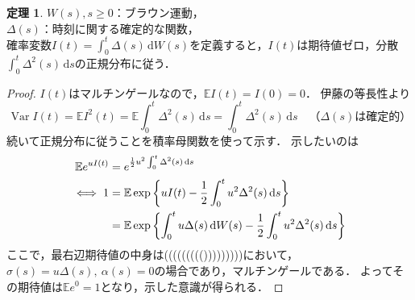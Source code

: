 \documentclass[a4paper, lualatex, ja=standard]{bxjsarticle}
\theoremstyle{definition}
\newtheorem{thm}{定理}[subsection]
\newcommand{\E}{\mathbb{E}}
\newcommand{\diff}{\mathrm{d}}
\begin{document}
\begin{thm}
  $W(s),s\geq0$：ブラウン運動，\\
  $\Delta(s)$：時刻に関する確定的な関数，\\
  確率変数$I(t)=\int_0^t\Delta(s)\,\diff W(s)$を定義すると，$I(t)$は期待値ゼロ，分散$\int_0^t\Delta^2(s)\,\diff s$の正規分布に従う．
\end{thm}
\begin{proof}
  $I(t)$はマルチンゲールなので，$\E I(t)=I(0)=0$．
  伊藤の等長性より
  \begin{equation*}
    \operatorname{Var} I(t) = \E I^2(t) = \E\int_0^t\Delta^2(s)\,\diff s=\int_0^t\Delta^2(s)\,\diff s\quad \text{（$\Delta(s)$は確定的）} 
  \end{equation*}
  続いて正規分布に従うことを積率母関数を使って示す．
  示したいのは
  \begin{align}
    \E e^{uI(t)} &= e^{\frac{1}{2}u^2\int_0^t\Delta^2(s)\,\diff s}\\
    \iff 1&= \E\exp\left\{uI(t)-\frac{1}{2}\int_0^tu^2\Delta^2(s)\,\diff s\right\} \notag\\
    &= \E\exp\left\{\int_0^tu\Delta(s)\,\diff W(s)-\frac{1}{2}\int_0^tu^2\Delta^2(s)\,\diff s\right\}
  \end{align}
  ここで，最右辺期待値の中身は((((((((()))))))))において，$\sigma(s)=u\Delta(s),\ \alpha(s)=0$の場合であり，マルチンゲールである．
  よってその期待値は$\E e^0=1$となり，示した意識が得られる．
\end{proof}
\end{document}
